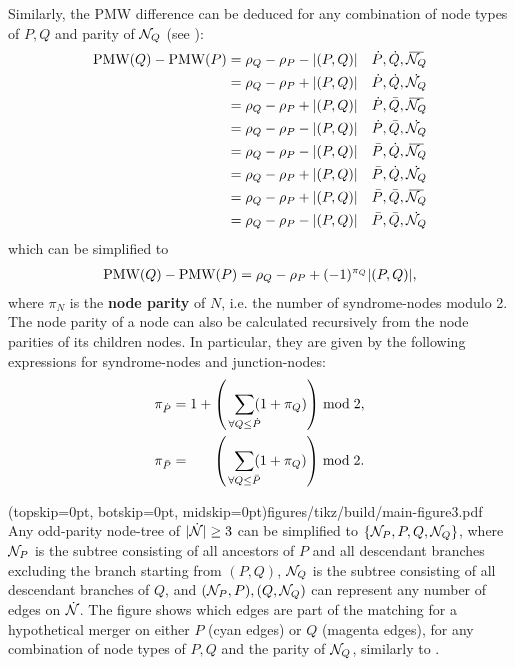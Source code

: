 Similarly, the PMW difference can be deduced for any combination of node types of $P,Q$ and parity of $\mathcal{N}_Q$ (see ):
\begin{align*}
  \text{PMW}({Q}) - \text{PMW}({P}) &= \rho_Q - \rho_P - \abs{(P,Q)}  &\dot{P}, \dot{Q}, \overbar{\nset_Q} \\
  &= \rho_Q - \rho_P + \abs{(P,Q)}  &\dot{P}, \dot{Q}, \dot{\nset_Q} \\
  &= \rho_Q - \rho_P + \abs{(P,Q)}  &\dot{P}, \bar{Q}, \overbar{\nset_Q} \\
  &= \rho_Q - \rho_P - \abs{(P,Q)}  &\dot{P}, \bar{Q}, \dot{\nset_Q} \\
  &= \rho_Q - \rho_P - \abs{(P,Q)}  &\bar{P}, \dot{Q}, \overbar{\nset_Q} \\
  &= \rho_Q - \rho_P + \abs{(P,Q)}  &\bar{P}, \dot{Q}, \dot{\nset_Q} \\
  &= \rho_Q - \rho_P + \abs{(P,Q)}  &\bar{P}, \bar{Q}, \overbar{\nset_Q} \\
  &= \rho_Q - \rho_P - \abs{(P,Q)}  &\bar{P}, \bar{Q}, \dot{\nset_Q} \\
\end{align*}
which can be simplified to 
\begin{multline}\label{eq:pmwdif}
    \text{PMW}({Q}) - \text{PMW}({P}) %
    =\rho_Q-\rho_P + (-1)^{\pi_Q}\abs{(P,Q)},%
\end{multline}
where $\pi_N$ is the \textbf{node parity} of $N$, i.e. the number of syndrome-nodes modulo 2. The node parity of a node can also be calculated recursively from the node parities of its children nodes. In particular, they are given by the following expressions for syndrome-nodes and junction-nodes: 
\begin{align}
    \pi_{\dot{P}} &= 1+\left(\hspace{.2cm} \sum_{\mathclap{\forall Q \leq \dot{P}}} (1+\pi_Q) \right ) \bmod 2, \label{eq:snodeparity}\\
    \pi_{\bar{P}} &= \hspace{.6cm} \left(\hspace{.2cm} \sum_{\mathclap{\forall Q \leq \bar{P}}} (1+\pi_Q) \right) \bmod 2. \label{eq:jnodeparity}
\end{align}

\Figure[tb](topskip=0pt, botskip=0pt, midskip=0pt){figures/tikz/build/main-figure3.pdf}{
  Any odd-parity node-tree of $\lvert\dot{\mathcal{N}}\rvert\geq 3$ can be simplified to $\{\mathcal{N}_P,P,Q,\mathcal{N}_Q\}$, where $\mathcal{N}_P$ is the subtree consisting of all ancestors of $P$ and all descendant branches excluding the branch starting from $(P,Q)$, $\mathcal{N}_Q$ is the subtree consisting of all descendant branches of $Q$, and $(\mathcal{N}_P, P), (Q, \mathcal{N}_Q)$ can represent any number of edges on $\dot{\mathcal{N}}$. The figure shows which edges are part of the matching for a hypothetical merger on either $P$ (cyan edges) or $Q$ (magenta edges), for any combination of node types of $P,Q$ and the parity of $\mathcal{N}_Q$, similarly to .
  \label{fig:nmcombi}}


